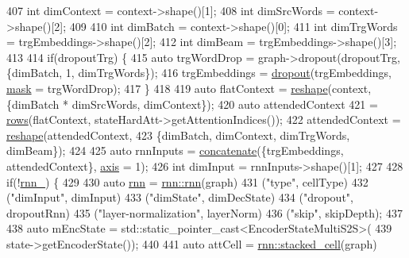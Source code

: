 \begin{DoxyCode}
407     \textcolor{keywordtype}{int} dimContext = context->shape()[1];
408     \textcolor{keywordtype}{int} dimSrcWords = context->shape()[2];
409 
410     \textcolor{keywordtype}{int} dimBatch = context->shape()[0];
411     \textcolor{keywordtype}{int} dimTrgWords = trgEmbeddings->shape()[2];
412     \textcolor{keywordtype}{int} dimBeam = trgEmbeddings->shape()[3];
413 
414     \textcolor{keywordflow}{if}(dropoutTrg) \{
415       \textcolor{keyword}{auto} trgWordDrop = graph->dropout(dropoutTrg, \{dimBatch, 1, dimTrgWords\});
416       trgEmbeddings = \hyperlink{namespacemarian_a268400392f22176821c7c4a36733b178}{dropout}(trgEmbeddings, \hyperlink{namespacemarian_1_1keywords_a201bea6bea8108889b63081132cc3cd7}{mask} = trgWordDrop);
417     \}
418 
419     \textcolor{keyword}{auto} flatContext = \hyperlink{namespacemarian_acd984f43188d0ae23c2a6ef13ae5293f}{reshape}(context, \{dimBatch * dimSrcWords, dimContext\});
420     \textcolor{keyword}{auto} attendedContext
421         = \hyperlink{namespacemarian_ace1e9a63d52edc363d70d661cf8d0257}{rows}(flatContext, stateHardAtt->getAttentionIndices());
422     attendedContext = \hyperlink{namespacemarian_acd984f43188d0ae23c2a6ef13ae5293f}{reshape}(attendedContext,
423                               \{dimBatch, dimContext, dimTrgWords, dimBeam\});
424 
425     \textcolor{keyword}{auto} rnnInputs = \hyperlink{namespacemarian_a2791a2c8f79a938f5cb22ae613680675}{concatenate}(\{trgEmbeddings, attendedContext\}, 
      \hyperlink{namespacemarian_1_1keywords_ace9158eabbddaca833133f12da98b9d6}{axis} = 1);
426     \textcolor{keywordtype}{int} dimInput = rnnInputs->shape()[1];
427 
428     \textcolor{keywordflow}{if}(!\hyperlink{classmarian_1_1DecoderHardSoftAtt_ae077a0f8f32a457c0c2c972ca4251ede}{rnn\_}) \{
429 
430       \textcolor{keyword}{auto} \hyperlink{namespacemarian_1_1rnn_aff1b115e415945b445f8d4a2068ec3e8}{rnn} = \hyperlink{namespacemarian_1_1rnn_aff1b115e415945b445f8d4a2068ec3e8}{rnn::rnn}(graph)
431                  (\textcolor{stringliteral}{"type"}, cellType)
432                  (\textcolor{stringliteral}{"dimInput"}, dimInput)
433                  (\textcolor{stringliteral}{"dimState"}, dimDecState)
434                  (\textcolor{stringliteral}{"dropout"}, dropoutRnn)
435                  (\textcolor{stringliteral}{"layer-normalization"}, layerNorm)
436                  (\textcolor{stringliteral}{"skip"}, skipDepth);
437 
438       \textcolor{keyword}{auto} mEncState = std::static\_pointer\_cast<EncoderStateMultiS2S>(
439         state->getEncoderState());
440 
441       \textcolor{keyword}{auto} attCell = \hyperlink{namespacemarian_1_1rnn_a55385034d5ad19187245bb2b564cb7eb}{rnn::stacked\_cell}(graph)

\end{DoxyCode}
